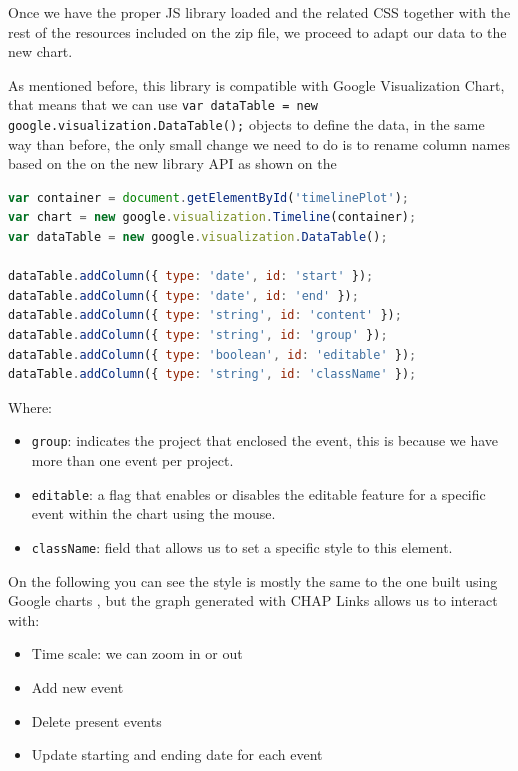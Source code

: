 Once we have the proper JS library loaded and the related CSS together with the
rest of the resources included on the zip file, we proceed to adapt our data to
the new chart.

As mentioned before, this library is compatible with Google Visualization
Chart, that means that we can use \texttt{var dataTable = new
google.visualization.DataTable();} objects to define the data, in the same way
than before, the only small change we need to do is to rename column names based
on the on the new library API as shown on the

\begin{lstlisting}[language=Javascript,breaklines=true,caption=CHAP\ Link\
library,label=f_interactivetimelines_code]
var container = document.getElementById('timelinePlot');
var chart = new google.visualization.Timeline(container);
var dataTable = new google.visualization.DataTable();

dataTable.addColumn({ type: 'date', id: 'start' });
dataTable.addColumn({ type: 'date', id: 'end' });
dataTable.addColumn({ type: 'string', id: 'content' });
dataTable.addColumn({ type: 'string', id: 'group' });
dataTable.addColumn({ type: 'boolean', id: 'editable' });
dataTable.addColumn({ type: 'string', id: 'className' });
\end{lstlisting} 

Where:
\begin{itemize}
  \item \texttt{group}: indicates the project that enclosed the event, this is
  because we have more than one event per project.
  \item \texttt{editable}: a flag that enables or disables the editable feature
  for a specific event within the chart using the mouse.
  \item \texttt{className}: field that allows us to set a specific style to this
  element.
\end{itemize}

On the following  you can see the style is mostly the
same to the one built using Google charts \reffigure{f_timeline_google},
but the graph generated with CHAP Links allows us to interact with:
\begin{itemize}
  \item Time scale: we can zoom in or out
  \item Add new event
  \item Delete present events
  \item Update starting and ending date for each event
\end{itemize}

